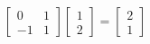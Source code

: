 \documentclass[preview]{standalone}
\begin{document}
\begin{align*}
\begin{bmatrix}0&1\\-1&1\end{bmatrix} \begin{bmatrix}1\\2\end{bmatrix} = \begin{bmatrix}2\\1\end{bmatrix}
\end{align*}
\end{document}
